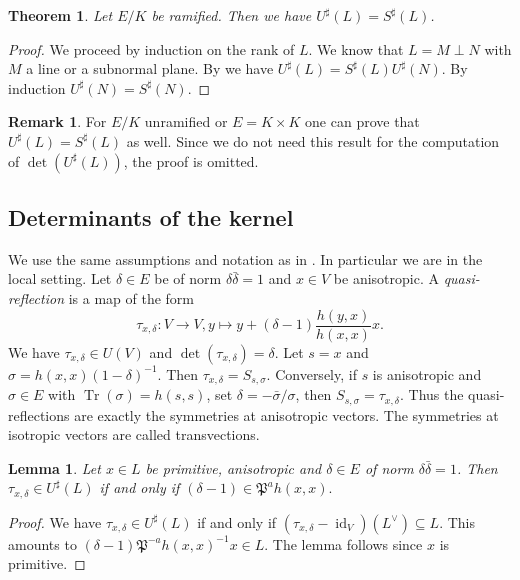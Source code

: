 \documentclass[a4paper]{amsart}
\theoremstyle{definition}
\newtheorem{remark}[definition]{Remark}
\theoremstyle{plain}
\newtheorem{theorem}[definition]{Theorem}
\newtheorem{lemma}[definition]{Lemma}
\DeclareMathOperator{\id}{id}
\DeclareMathOperator{\Tr}{Tr}
\newcommand{\FP}{\mathfrak{P}}
\newcommand{\sprod}[2]{h( #1, #2)}
\newcommand{\sprodq}[2]{h( #1,#1)}
\begin{document}
%
%
%
%
%
%
%
%
%
%
%
%
%
%
%
%
%
%
%
%
%
%
%
%
%
%
%
%
%
%
%
%
%
%
%
%
%
%
%
%
%
%
%
%
%
%
%
%
%
%
%
%
%
%
%
%
%
%
%
%
%
%
%
%
%
%
%
%
%
%
%
%
%
%
%
%
%
%
%
%
%
%
%
%
%
\begin{theorem}\label{ker:ramif}
 Let $E/K$ be ramified. Then we have $U^\sharp(L) = S^\sharp(L)$.
\end{theorem}
\begin{proof}
We proceed by induction on the rank of $L$. We know that
$L = M \perp N$ with $M$ a line or a subnormal plane. By  we have $U^\sharp(L) = S^\sharp(L)U^\sharp(N)$. By induction $U^\sharp(N)=S^\sharp(N)$.
%
%
%
%
\end{proof}

\begin{remark}
For $E/K$ unramified or $E=K \times K$ one can prove that $U^\sharp(L)= S^\sharp(L)$ as well. Since we do not need this result for the computation of $\det(U^\sharp(L))$, the proof is omitted.
\end{remark}
%
%
%
%
%
%
%
%
%
%
%
%
%
%
%
%
%
%
%
%
%
%
%
%
%
%
%
%
%
%
%
%
%
%
%
%
%
%
%
%
%
%
%
%


\subsection{Determinants of the kernel}
We use the same assumptions and notation as in .
In particular we are in the local setting.
Let $\delta \in E$ be of norm $\delta \bar \delta = 1$ and $x \in V$ be anisotropic.
A \emph{quasi-reflection} is a map of the form
\[\tau_{x,\delta}\colon V \rightarrow V, y \mapsto y + (\delta-1)\frac{\sprod{y}{x}}{\sprodq{x}{x}} x.\]
We have $\tau_{x,\delta} \in U(V)$ and $\det(\tau_{x,\delta}) = \delta$.
Let $s = x$ and $\sigma = \sprodq{x}{x}(1-\delta)^{-1}$.
Then $\tau_{x,\delta}=S_{s,\sigma}$.
Conversely, if $s$ is anisotropic and $\sigma \in E$ with $\Tr(\sigma)=\sprodq{s}{s}$, set $\delta = - \bar \sigma / \sigma$, then
$S_{s,\sigma} = \tau_{x,\delta}$. Thus the quasi-reflections are exactly the symmetries at anisotropic vectors. The symmetries at isotropic vectors are called transvections.

\begin{lemma}\label{ker:refl}
Let $x \in L$ be primitive, anisotropic and $\delta \in E$ of norm $\delta \bar \delta = 1$. Then
$\tau_{x,\delta} \in U^\sharp(L)$ if and only if
$(\delta - 1) \in \FP^{a} \sprodq{x}{x}.$
\end{lemma}
\begin{proof}
 We have $\tau_{x,\delta} \in U^\sharp(L)$ if and only if
 $(\tau_{x,\delta}-\id_V)(L^\vee)\subseteq L$. This amounts to $(\delta-1)\FP^{-a}\sprodq{x}{x}^{-1}x \in L$.
 The lemma follows since $x$ is primitive.
\end{proof}
\end{document}
